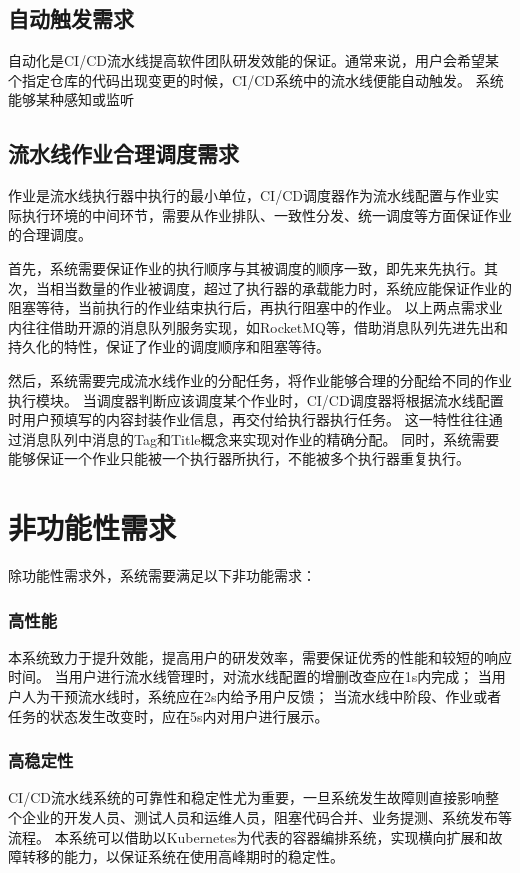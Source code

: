 \subsection{自动触发需求}
自动化是CI/CD流水线提高软件团队研发效能的保证。通常来说，用户会希望某个指定仓库的代码出现变更的时候，CI/CD系统中的流水线便能自动触发。
系统能够某种感知或监听

\subsection{流水线作业合理调度需求}
\label{subsec:流水线作业合理调度需求}

作业是流水线执行器中执行的最小单位，CI/CD调度器作为流水线配置与作业实际执行环境的中间环节，需要从作业排队、一致性分发、统一调度等方面保证作业的合理调度。

首先，系统需要保证作业的执行顺序与其被调度的顺序一致，即先来先执行。其次，当相当数量的作业被调度，超过了执行器的承载能力时，系统应能保证作业的阻塞等待，当前执行的作业结束执行后，再执行阻塞中的作业。
以上两点需求业内往往借助开源的消息队列服务实现，如RocketMQ等，借助消息队列先进先出和持久化的特性，保证了作业的调度顺序和阻塞等待。

然后，系统需要完成流水线作业的分配任务，将作业能够合理的分配给不同的作业执行模块。
当调度器判断应该调度某个作业时，CI/CD调度器将根据流水线配置时用户预填写的内容封装作业信息，再交付给执行器执行任务。
这一特性往往通过消息队列中消息的Tag和Title概念来实现对作业的精确分配。
同时，系统需要能够保证一个作业只能被一个执行器所执行，不能被多个执行器重复执行。


\section{非功能性需求}

除功能性需求外，系统需要满足以下非功能需求：

\subsubsection{高性能}
本系统致力于提升效能，提高用户的研发效率，需要保证优秀的性能和较短的响应时间。
当用户进行流水线管理时，对流水线配置的增删改查应在1s内完成；
当用户人为干预流水线时，系统应在2s内给予用户反馈；
当流水线中阶段、作业或者任务的状态发生改变时，应在5s内对用户进行展示。

\subsubsection{高稳定性}
CI/CD流水线系统的可靠性和稳定性尤为重要，一旦系统发生故障则直接影响整个企业的开发人员、测试人员和运维人员，阻塞代码合并、业务提测、系统发布等流程。
本系统可以借助以Kubernetes为代表的容器编排系统，实现横向扩展和故障转移的能力，以保证系统在使用高峰期时的稳定性。

